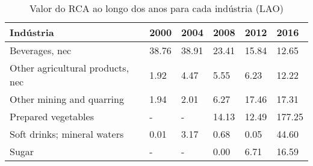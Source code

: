 \begin{table}
\centering
\caption{Valor do RCA ao longo dos anos para cada indústria (LAO)}
\label{tab:ex3-tempo-LAO}
\begin{tabular}{p{6cm}p{1.5cm}p{1.5cm}p{1.5cm}p{1.5cm}p{1.5cm}}
\toprule
                       Indústria &  2000 &  2004 &  2008 &  2012 &   2016 \\
\midrule
                  Beverages, nec & 38.76 & 38.91 & 23.41 & 15.84 &  12.65 \\
Other agricultural products, nec &  1.92 &  4.47 &  5.55 &  6.23 &  12.22 \\
       Other mining and quarring &  1.94 &  2.01 &  6.27 & 17.46 &  17.31 \\
             Prepared vegetables &     - &     - & 14.13 & 12.49 & 177.25 \\
     Soft drinks; mineral waters &  0.01 &  3.17 &  0.68 &  0.05 &  44.60 \\
                           Sugar &     - &     - &  0.00 &  6.71 &  16.59 \\
\bottomrule
\end{tabular}
\end{table}
